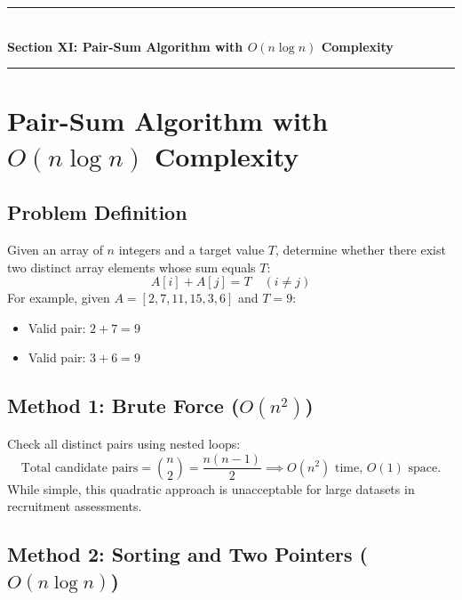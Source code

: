 \newpage
\begin{center}
\vspace{0.5em}
{\color{primary}\rule{0.45\textwidth}{1.2pt}}\\[4pt]
{\Large\bfseries\color{primary} Section XI: Pair-Sum Algorithm with $O(n \log n)$ Complexity}\\[2pt]
{\color{primary}\rule{0.45\textwidth}{1.2pt}}
\vspace{0.5em}
\end{center}

\section{Pair-Sum Algorithm with $O(n \log n)$ Complexity}

\subsection{Problem Definition}

Given an array of $n$ integers and a target value $T$, determine whether there exist two distinct array elements whose sum equals $T$:
\[
A[i] + A[j] = T \quad (i \neq j)
\]
For example, given $A = [2, 7, 11, 15, 3, 6]$ and $T = 9$:
\begin{itemize}
    \item Valid pair: $2 + 7 = 9$
    \item Valid pair: $3 + 6 = 9$
\end{itemize}

\subsection{Method 1: Brute Force ($O(n^2)$)}
Check all distinct pairs using nested loops:
\[
\text{Total candidate pairs} = \binom{n}{2} = \frac{n(n-1)}{2} \implies O(n^2) \text{ time, } O(1) \text{ space.}
\]
While simple, this quadratic approach is unacceptable for large datasets in recruitment assessments.

\subsection{Method 2: Sorting and Two Pointers ($O(n \log n)$)}

